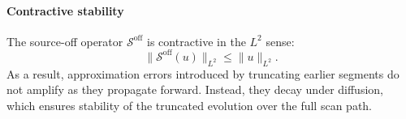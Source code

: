 \documentclass[conference]{IEEEtran}
\begin{document}
\paragraph{Contractive stability}
The source-off operator $\mathcal{S}^{\mathrm{off}}$ is contractive in the $L^2$ sense:
\begin{equation}
\|\mathcal{S}^{\mathrm{off}}(u)\|_{L^2} \le \|u\|_{L^2}.
\label{eq:stability_contraction}
\end{equation}
As a result, approximation errors introduced by truncating earlier segments do not amplify as they propagate forward. Instead, they decay under diffusion, which ensures stability of the truncated evolution over the full scan path.



\end{document}
